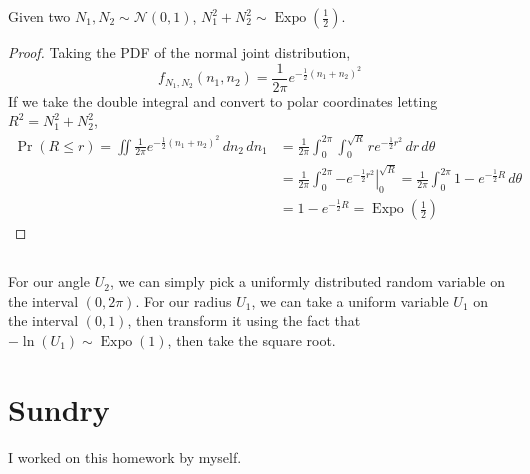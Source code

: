 \documentclass{article}
\newcommand{\Expo}{\operatorname{Expo}}
\begin{document}
\begin{theorem}
    Given two \(N_1, N_2 \sim \mathcal{N}(0, 1)\), \(N_1^2 + N_2^2 \sim \Expo\left(\frac{1}{2}\right)\).
\end{theorem}
\begin{proof}
    Taking the PDF of the normal joint distribution,
    \begin{equation}
        f_{N_1, N_2}(n_1, n_2) = \frac{1}{2 \pi} e^{-\frac{1}{2}(n_1 + n_2)^2}
    \end{equation}
    If we take the double integral and convert to polar coordinates letting \(R^2 = N_1^2 + N_2^2\),
    \begin{align}
        \Pr(R \leqslant r) = \iint \frac{1}{2 \pi} e^{-\frac{1}{2}(n_1 + n_2)^2} \, dn_2 \, dn_1 &= \frac{1}{2 \pi} \int_0^{2\pi} \int_0^{\sqrt{R}} r e^{-\frac{1}{2}r^2} \, dr \, d\theta \\
        &= \frac{1}{2 \pi} \int_0^{2\pi} \left.-e^{-\frac{1}{2}r^2}\right|_0^{\sqrt{R}} = \frac{1}{2\pi} \int_0^{2\pi} 1 - e^{-\frac{1}{2}R} \, d\theta \\
        &= 1 - e^{-\frac{1}{2}R} = \Expo\left(\frac{1}{2}\right)
    \end{align}
\end{proof}

\subsection{}

For our angle \(U_2\), we can simply pick a uniformly distributed random variable on the interval \((0, 2\pi)\).
For our radius \(U_1\), we can take a uniform variable \(U_1\) on the interval \((0, 1)\), then transform it using the fact that \(-\ln(U_1) \sim \Expo(1)\), then take the square root.

\section{Sundry}

I worked on this homework by myself.
\end{document}
